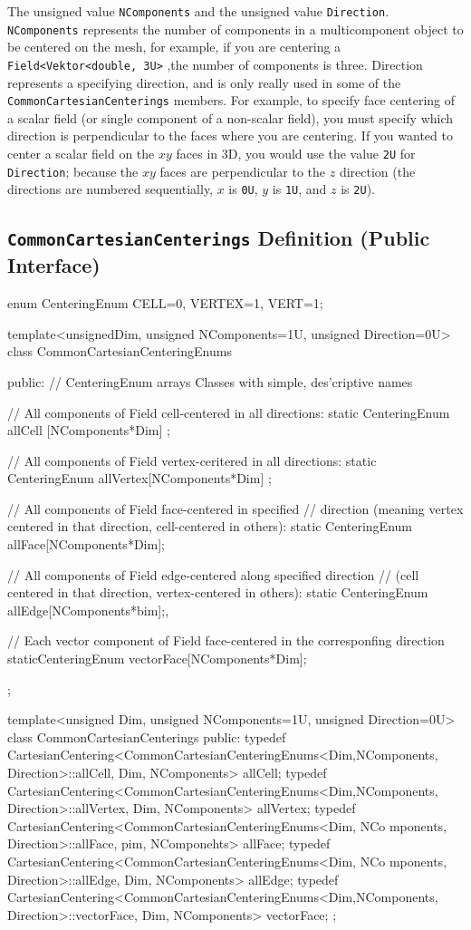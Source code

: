 The unsigned value \texttt{NComponents} and the unsigned value \texttt{Direction}. \texttt{NComponents} represents the number of components in a multicomponent object to be centered on the mesh, 
for example, if you are centering a \texttt{Field<Vektor<double, 3U>} ,the number of components is three. Direction represents a specifying direction, and is only really used in some of the 
\texttt{CommonCartesianCenterings} members. For example, to specify face centering of a scalar field (or single component of a non-scalar field), you must specify which direction is perpendicular 
to the faces where you are centering. If you wanted to center a scalar field on the $xy$ faces in 3D, you would use the value \texttt{2U} for \texttt{Direction}; because the $xy$ faces are perpendicular to 
the $z$ direction (the directions are numbered sequentially, $x$ is \texttt{0U}, $y$ is \texttt{1U}, and $z$ is \texttt{2U}). 

\subsection{\texttt{CommonCartesianCenterings} Definition (Public Interface)}
\begin{smallcode}

enum CenteringEnum {CELL=0, VERTEX=1, VERT=1};
 
template<unsignedDim, unsigned NComponents=1U, unsigned Direction=0U> 
class CommonCartesianCenteringEnums
{ 
public: 
// CenteringEnum arrays Classes with simple, des'criptive names 

// All components of Field cell-centered in all directions: 
static CenteringEnum allCell [NComponents*Dim] ;
 
// All components of Field vertex-ceritered in all directions: 
static CenteringEnum allVertex[NComponents*Dim] ; 

// All components of Field face-centered in specified 
// direction (meaning vertex centered in that direction, cell-centered in others): 
static CenteringEnum allFace[NComponents*Dim];

// All components of Field edge-centered along specified direction
// (cell centered in that direction, vertex-centered in others): 
static CenteringEnum allEdge[NComponents*bim];, 

// Each vector component of Field face-centered in the corresponfing direction 
staticCenteringEnum vectorFace[NComponents*Dim]; 
} ; 

template<unsigned Dim, unsigned NComponents=1U, unsigned Direction=0U> 
class CommonCartesianCenterings 
{ 
public: 
typedef CartesianCentering<CommonCartesianCenteringEnums<Dim,NComponents,
Direction>::allCell, Dim, NComponents> allCell; 
typedef CartesianCentering<CommonCartesianCenteringEnums<Dim,NComponents,
Direction>::allVertex, Dim, NComponents> allVertex; 
typedef CartesianCentering<CommonCartesianCenteringEnums<Dim, NCo mponents,
Direction>::allFace, pim, NComponehts> allFace; 
typedef CartesianCentering<CommonCartesianCenteringEnums<Dim, NCo mponents,
Direction>::allEdge, Dim, NComponents> allEdge; 
typedef CartesianCentering<CommonCartesianCenteringEnums<Dim,NComponents,
Direction>::vectorFace, Dim, NComponents> vectorFace; 
}; 
\end{smallcode}


